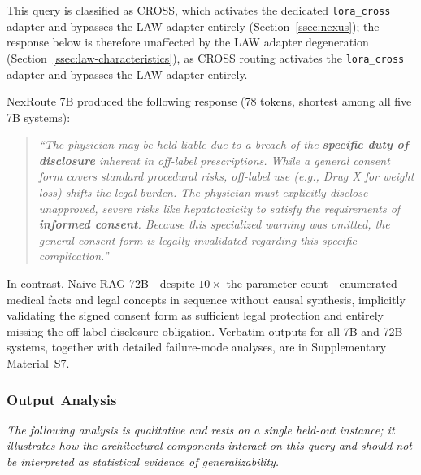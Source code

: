 \documentclass[a4paper,fleql,doubleblind]{cas-sc}
\begin{document}
This query is classified as CROSS, which activates the dedicated \texttt{lora\_cross}
adapter and bypasses the LAW adapter entirely (Section~\ref{ssec:nexus}); the response
below is therefore unaffected by the LAW adapter degeneration
(Section~\ref{ssec:law-characteristics}), as CROSS routing activates
the \texttt{lora\_cross} adapter and bypasses the LAW adapter entirely.

NexRoute 7B produced the following response (78 tokens, shortest among all five 7B systems):
\begin{quote}\small
\textit{``The physician may be held liable due to a breach of the \textbf{specific duty of disclosure} inherent in off-label prescriptions. While a general consent form covers standard procedural risks, off-label use (e.g., Drug X for weight loss) shifts the legal burden. The physician must explicitly disclose unapproved, severe risks like hepatotoxicity to satisfy the requirements of \textbf{informed consent}. Because this specialized warning was omitted, the general consent form is legally invalidated regarding this specific complication.''}
\end{quote}
In contrast, Naive RAG 72B---despite $10\times$ the parameter count---enumerated medical facts and legal concepts in sequence without causal synthesis, implicitly validating the signed consent form as sufficient legal protection and entirely missing the off-label disclosure obligation. Verbatim outputs for all 7B and 72B systems, together with detailed failure-mode analyses, are in Supplementary Material~S7.

\subsubsection{Output Analysis}
\label{sssec:nexroute-advantages}
\emph{The following analysis is qualitative and rests on a single held-out instance;
it illustrates how the architectural components interact on this query and
should not be interpreted as statistical evidence of generalizability.}
\end{document}
